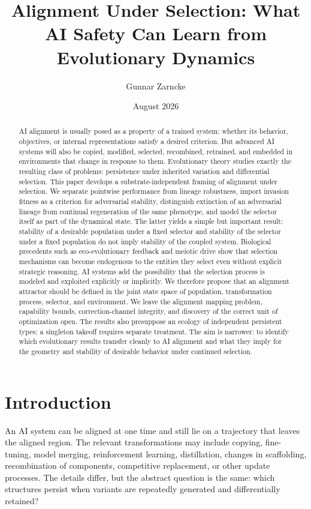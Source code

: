 \documentclass[11pt]{article}
\title{\textbf{Alignment Under Selection: What AI Safety Can Learn from Evolutionary Dynamics}}
\author{Gunnar Zarncke}
\date{August 2026}
\begin{document}
\maketitle

\begin{abstract}
AI alignment is usually posed as a property of a trained system: whether its behavior, objectives, or internal representations satisfy a desired criterion. But advanced AI systems will also be copied, modified, selected, recombined, retrained, and embedded in environments that change in response to them. Evolutionary theory studies exactly the resulting class of problems: persistence under inherited variation and differential selection. This paper develops a substrate-independent framing of alignment under selection. We separate pointwise performance from lineage robustness, import invasion fitness as a criterion for adversarial stability, distinguish extinction of an adversarial lineage from continual regeneration of the same phenotype, and model the selector itself as part of the dynamical state. The latter yields a simple but important result: stability of a desirable population under a fixed selector and stability of the selector under a fixed population do not imply stability of the coupled system. Biological precedents such as eco-evolutionary feedback and meiotic drive show that selection mechanisms can become endogenous to the entities they select even without explicit strategic reasoning. AI systems add the possibility that the selection process is modeled and exploited explicitly or implicitly. We therefore propose that an alignment attractor should be defined in the joint state space of population, transformation process, selector, and environment. We leave the alignment mapping problem, capability bounds, correction-channel integrity, and discovery of the correct unit of optimization open. The results also presuppose an ecology of independent persistent types; a singleton takeoff requires separate treatment. The aim is narrower: to identify which evolutionary results transfer cleanly to AI alignment and what they imply for the geometry and stability of desirable behavior under continued selection.
\end{abstract}

\section{Introduction}

An AI system can be aligned at one time and still lie on a trajectory that leaves the aligned region. The relevant transformations may include copying, fine-tuning, model merging, reinforcement learning, distillation, changes in scaffolding, recombination of components, competitive replacement, or other update processes. The details differ, but the abstract question is the same: which structures persist when variants are repeatedly generated and differentially retained?
\end{document}
